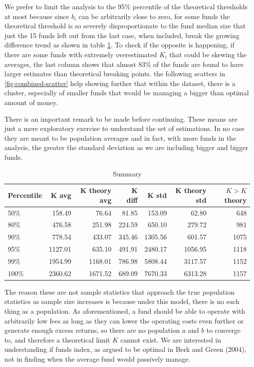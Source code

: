\documentclass[12pt]{article}
\begin{document}
\par We prefer to limit the analysis to the 95\% percentile of the theoretical thresholds at most because since $b_i$ can be arbitrarily close to zero, for some funds the theoretical threshold is so severely disproportionate to the fund median size that just the 15 funds left out from the last case, when included, break the growing difference trend as shown in table \ref{tab:std K 001}.
To check if the opposite is happening, if there are some funds with extremely overestimated $K_i$ that could be skewing the averages, the last column shows that almost $83\% $ of the funds are found to have larger estimates than theoretical breaking points. the following scatters in \ref{fig:combined-scatter} help showing further that within the dataset, there is a cluster, especially of smaller funds that would be managing a bigger than optimal amount of money.


\par
There is an important remark to be made before continuing. These means are just a mere exploratory exercise to understand the set of estimations. In no case they are meant to be population averages and in fact, with more funds in the analysis, the greater the standard deviation as we are including bigger and bigger funds. 


\begin{table}[H]
    \centering
    \caption{Summary }
    \label{tab:std K 001}
    \begin{tabular}{lrrrrrr}
        \hline
        Percentile & K avg & K theory avg & K diff & K std & K theory std & $K>K$ theory \\
        \hline
        50\% & 158.49 & 76.64 & 81.85 & 153.09 & 62.80 & 648 \\
        80\% & 476.58 & 251.98 & 224.59 & 650.10 & 279.72 & 981 \\
        90\% & 778.54 & 433.07 & 345.46 & 1305.56 & 601.57 & 1075 \\
        95\% & 1127.01 & 635.10 & 491.91 & 2480.17 & 1056.95 & 1118 \\
        99\% & 1954.99 & 1168.01 & 786.98 & 5808.44 & 3117.57 & 1152 \\
        100\% & 2360.62 & 1671.52 & 689.09 & 7670.33 & 6313.28 & 1157 \\
        \hline
    \end{tabular}
\end{table}
The reason these are not sample statistics that approach the true population statistics as sample size increases is because under this model, there is no such thing as a population. As aforementioned, a fund should be able to operate with arbitrarily low fees as long as they can lower the operating costs even further or generate enough excess returns, so there are no population $a$ and $b$ to converge to, and therefore a theoretical limit $K$ cannot exist. We are interested in understanding if funds index, as argued to be optimal in Berk and Green (2004), not in finding when the average fund would passively manage.
\end{document}
